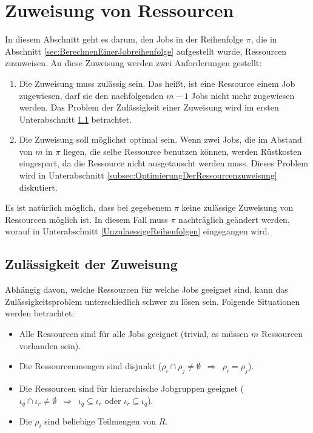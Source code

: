 \documentclass{scrreprt}
\begin{document}
\section{Zuweisung von Ressourcen}
\label{sec:ZuweisungVonRessourcen}
In diesem Abschnitt geht es darum, den Jobs in der Reihenfolge $\pi$, die in Abschnitt \ref{sec:BerechnenEinerJobreihenfolge} aufgestellt wurde,
Ressourcen zuzuweisen. An diese Zuweisung werden zwei Anforderungen gestellt:
\begin{enumerate}
    \item Die Zuweisung muss zulässig sein. Das heißt, ist eine Ressource einem Job zugewiesen, darf sie den nachfolgenden $m-1$ Jobs nicht mehr zugewiesen werden.
        Das Problem der Zulässigkeit einer Zuweisung wird im ersten Unterabschnitt \ref{subsec:ZulaessigkeitDerZuweisung} betrachtet.
    \item Die Zuweisung soll möglichst optimal sein. Wenn zwei Jobs, die im Abstand von $m$ in $\pi$ liegen, die selbe Ressource benutzen können,
        werden Rüstkosten eingespart, da die Ressource nicht ausgetauscht werden muss.
        Dieses Problem wird in Unterabschnitt \ref{subsec:OptimierungDerRessourcenzuweisung} diskutiert.
\end{enumerate}
Es ist natürlich möglich, dass bei gegebenem $\pi$ keine zulässige Zuweisung von Ressourcen möglich ist.
In diesem Fall muss $\pi$ nachträglich geändert werden, worauf in Unterabschnitt \ref{UnzulaessigeReihenfolgen} eingegangen wird.

\subsection{Zulässigkeit der Zuweisung}
\label{subsec:ZulaessigkeitDerZuweisung}
Abhängig davon, welche Ressourcen für welche Jobs geeignet sind, kann das Zulässigkeitsproblem unterschiedlich schwer zu lösen sein.
Folgende Situationen werden betrachtet:
\begin{itemize}
    \item Alle Ressourcen sind für alle Jobs geeignet (trivial, es müssen $m$ Ressourcen vorhanden sein).
    \item Die Ressourcenmengen sind disjunkt ($\rho_i\cap\rho_j \neq \emptyset \enspace \Rightarrow \enspace \rho_i = \rho_j$).
    \item Die Ressourcen sind für hierarchische Jobgruppen geeignet 
        ($\iota_q\cap\iota_r \neq \emptyset \enspace \Rightarrow \enspace \iota_q\subseteq\iota_r$ oder $\iota_r\subseteq\iota_q$).
    \item Die $\rho_i$ sind beliebige Teilmengen von $R$.
\end{itemize}
\end{document}
